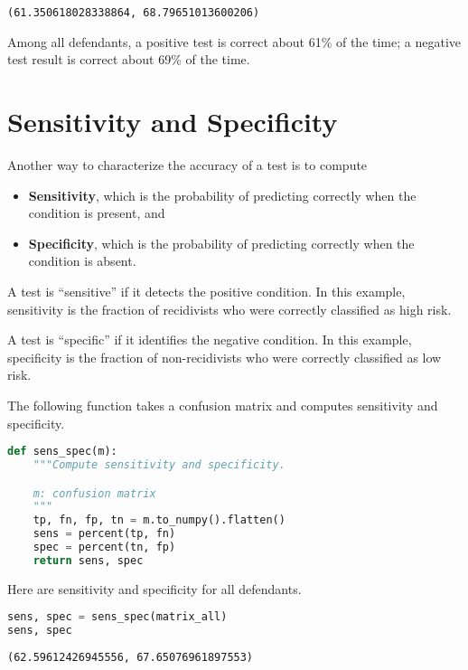 \begin{lstlisting}[style=output]
(61.350618028338864, 68.79651013600206)
\end{lstlisting}

Among all defendants, a positive test is correct about 61\% of the time;
a negative test result is correct about 69\% of the time.

\section{Sensitivity and Specificity}\label{sensitivity-and-specificity}

Another way to characterize the accuracy of a test is to compute

\begin{itemize}
\item
  \textbf{Sensitivity}, which is the probability of predicting correctly
  when the condition is present, and
\item
  \textbf{Specificity}, which is the probability of predicting correctly
  when the condition is absent.
\end{itemize}

A test is ``sensitive'' if it detects the positive condition. In this
example, sensitivity is the fraction of recidivists who were correctly
classified as high risk.

A test is ``specific'' if it identifies the negative condition. In this
example, specificity is the fraction of non-recidivists who were
correctly classified as low risk.

The following function takes a confusion matrix and computes sensitivity
and specificity.

\begin{lstlisting}[language=Python,style=source]
def sens_spec(m):
    """Compute sensitivity and specificity.

    m: confusion matrix
    """
    tp, fn, fp, tn = m.to_numpy().flatten()
    sens = percent(tp, fn)
    spec = percent(tn, fp)
    return sens, spec
\end{lstlisting}

Here are sensitivity and specificity for all defendants.

\begin{lstlisting}[language=Python,style=source]
sens, spec = sens_spec(matrix_all)
sens, spec
\end{lstlisting}

\begin{lstlisting}[style=output]
(62.59612426945556, 67.65076961897553)
\end{lstlisting}

